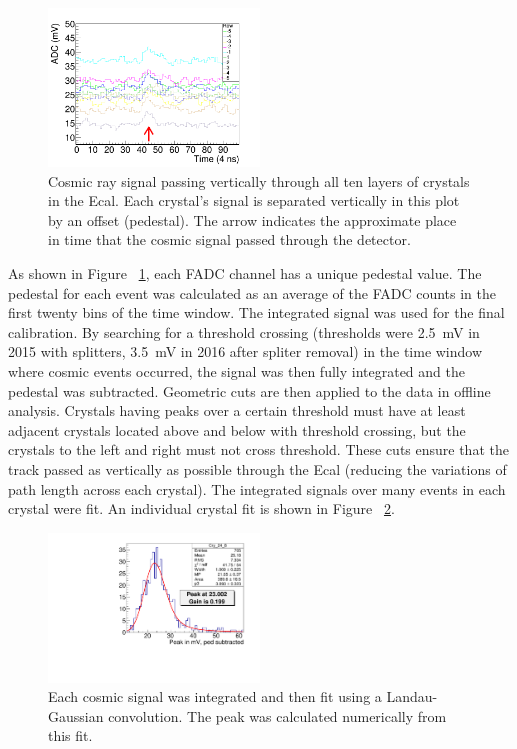 \documentclass[twoside]{article}
\begin{document}
\begin{multicols}{2}
\begin{figure}[H]
  \centering
      \includegraphics[width=0.5\textwidth]{pics/cosmicSignal.png}
  \caption{Cosmic ray signal passing vertically through all ten layers of crystals in the Ecal. Each crystal's signal is separated vertically in this plot by an offset (pedestal). The arrow indicates the approximate place in time that the cosmic signal passed through the detector.}
  \label{cosmicSignal}
\end{figure}	

As shown in Figure ~\ref{cosmicSignal}, each FADC channel has a unique pedestal value. The pedestal for each event was calculated as an average of the FADC counts in the first twenty bins of the time window. The integrated signal was used for the final calibration. By searching for a threshold crossing (thresholds were 2.5~mV in 2015 with splitters, 3.5~mV in 2016 after spliter removal) in the time window where cosmic events occurred, the signal was then fully integrated and the pedestal was subtracted. Geometric cuts are then applied to the data in offline analysis. Crystals having peaks over a certain threshold must have at least adjacent crystals located above and below with threshold crossing, but the crystals to the left and right must not cross threshold. These cuts ensure that the track passed as vertically as possible through the Ecal (reducing the variations of path length across each crystal). The integrated signals over many events in each crystal were fit. An individual crystal fit is shown in Figure ~\ref{cosmicFit}. 

\begin{figure}[H]
  \centering
      \includegraphics[width=0.5\textwidth]{pics/cosmicFitExample.pdf}
  \caption{Each cosmic signal was integrated and then fit using a Landau-Gaussian convolution. The peak was calculated numerically from this fit.}
  \label{cosmicFit}
\end{figure}


\end{multicols}
\end{document}
